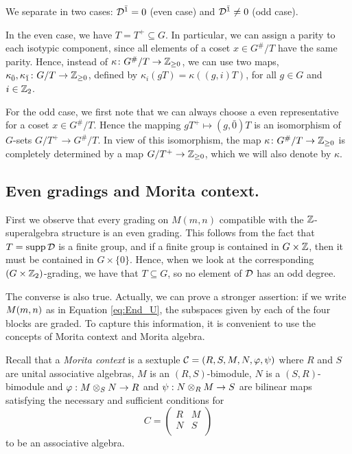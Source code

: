 We separate in two cases: $\mathcal{D}^{\bar1} = 0$ (even case) and $\mathcal{D}^{\bar1} \neq 0$ (odd case).

In the even case, we have $T = T^+ \subseteq G$.
In particular, we can assign a parity to each isotypic component, since all elements of a coset $x \in G^\#/T$ have the same parity.
Hence, instead of $\kappa\colon G^\#/T \to \mathbb{Z}_{\geq 0}$, we can use two maps, $\kappa_{\bar 0}, \kappa_{\bar 1}\colon G/T \to \mathbb{Z}_{\geq 0}$, defined by $\kappa_i ( gT ) = \kappa ( (g,i)T )$, for all $g\in G$ and $i \in \mathbb{Z}_2$.

For the odd case, we first note that we can always choose a even representative for a coset $x \in G^\#/T$.
Hence the mapping $g T^+ \mapsto (g, \bar 0) T$ is an isomorphism of $G$-sets $G/T^+ \to G^\#/T$.
In view of this isomorphism, the map $\kappa\colon G^\#/T \to \mathbb{Z}_{\geq 0}$ is completely determined by a map $G/T^+ \to \mathbb{Z}_{\geq 0}$, which we will also denote by $\kappa$.

\subsection{Even gradings and Morita context.}\label{subsec:even-gradings}

First we observe that every grading on $M(m,n)$ compatible with the $\mathbb{Z}$-superalgebra structure is an even grading. This follows from the fact that $T=\operatorname{supp} \mathcal{D}$ is a finite group, and if a finite group is contained in $G\times \mathbb{Z}$, then it must be contained in $G\times \{0\}$. Hence, when we look at the corresponding $(G\times\mathbb{Z}_2)$-grading, we have that $T\subseteq G$, so no element of $\mathcal{D}$ has an odd degree.

The converse is also true. Actually, we can prove a stronger assertion: if we write $M(m,n)$ as in Equation \eqref{eq:End_U}, the subspaces given by each of the four blocks are graded. To capture this information, it is convenient to use the concepts of Morita context and Morita algebra.

Recall that a \emph{Morita context} is a sextuple $\mathcal{C} = (R, S, M, N, \varphi, \psi )$ where $R$ and $S$ are unital associative algebras, $M$ is an $(R,S)$-bimodule, $N$ is a $(S,R)$-bimodule and $\varphi: M\otimes_{S} N\rightarrow R$ and $\psi: N\otimes_{R} M\rightarrow S$ are bilinear maps satisfying the necessary and sufficient conditions for
\begin{equation*}
	C = \left(\begin{matrix}\label{eq:morita-algebra}
			R & M \\
			N & S \\
		\end{matrix}
	\right)
\end{equation*}
to be an associative algebra.%

